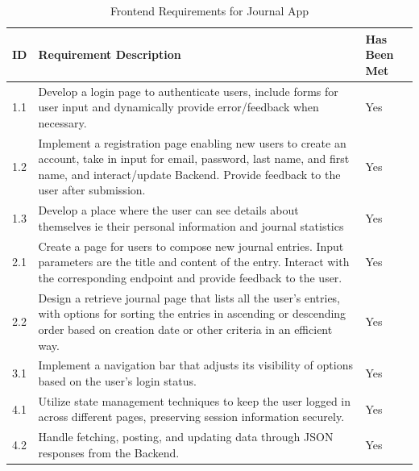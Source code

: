 \begin{table}[H]
    \centering
    \begin{tabular}{|l|p{8cm}|p{4cm}|}
    \hline
    \textbf{ID} & \textbf{Requirement Description} & \textbf{Has Been Met}\\ \hline
    1.1 & Develop a login page to authenticate users, include forms for user input and dynamically provide error/feedback when necessary. & Yes \\ \hline
    
    1.2 & Implement a registration page enabling new users to create an account, take in input for email, password, last name, and first name, and interact/update Backend. Provide feedback to the user after submission. & Yes\\ \hline
    
    1.3 & Develop a place where the user can see details about themselves ie their personal information and journal statistics & Yes\\ \hline
    
    2.1 & Create a page for users to compose new journal entries. Input parameters are the title and content of the entry. Interact with the corresponding endpoint and provide feedback to the user.& Yes\\ \hline
    
    2.2 & Design a retrieve journal page that lists all the user’s entries, with options for sorting the entries in ascending or descending order based on creation date or other criteria in an efficient way. & Yes\\ \hline
    
    3.1 & Implement a navigation bar that adjusts its visibility of options based on the user's login status. & Yes\\ \hline
    
    4.1 & Utilize state management techniques to keep the user logged in across different pages, preserving session information securely. & Yes\\ \hline
    
    4.2 & Handle fetching, posting, and updating data through JSON responses from the Backend. & Yes \\ \hline
\end{tabular}
\caption{Frontend Requirements for Journal App}
\end{table}
    
